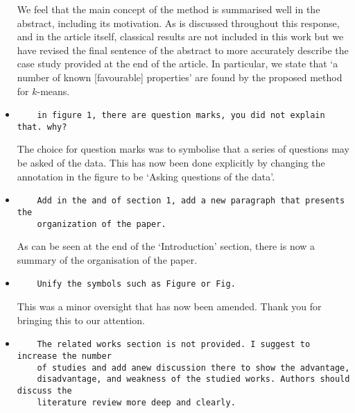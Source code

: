 \documentclass[11pt]{article}
\begin{document}
\begin{itemize}
We feel that the main concept of the method is summarised well in the abstract,
including its motivation. As is discussed throughout this response, and in the
article itself, classical results are not included in this work but we have
revised the final sentence of the abstract to more accurately describe the case
study provided at the end of the article. In particular, we state that `a
number of known [favourable] properties' are found by the proposed method for
\(k\)-means.

\item
\begin{verbatim}
    in figure 1, there are question marks, you did not explain that. why?
\end{verbatim}

The choice for question marks was to symbolise that a series of questions may be
asked of the data. This has now been done explicitly by changing the annotation
in the figure to be `Asking questions of the data'.

\item
\begin{verbatim}
    Add in the and of section 1, add a new paragraph that presents the
    organization of the paper.
\end{verbatim}

As can be seen at the end of the `Introduction' section, there is now a summary
of the organisation of the paper.


\item
\begin{verbatim}
    Unify the symbols such as Figure or Fig.
\end{verbatim}

This was a minor oversight that has now been amended. Thank you for bringing
this to our attention.

\item
\begin{verbatim}
    The related works section is not provided. I suggest to increase the number
    of studies and add anew discussion there to show the advantage,
    disadvantage, and weakness of the studied works. Authors should discuss the
    literature review more deep and clearly.
\end{verbatim}



\end{itemize}
\end{document}

